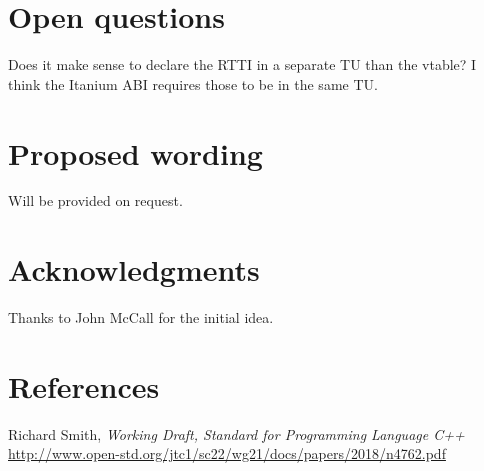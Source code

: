 \documentclass{wg21}
\begin{document}
\section{Open questions}
Does it make sense to declare the RTTI in a separate TU than the vtable?
I think the Itanium ABI requires those to be in the same TU.

\section{Proposed wording}
Will be provided on request.

\section{Acknowledgments}
Thanks to John McCall for the initial idea.

\section{References}
\renewcommand{\section}[2]{}%
\begin{thebibliography}{9}

  Richard Smith,
  \emph{Working Draft, Standard for Programming Language C++}\newline
  \url{http://www.open-std.org/jtc1/sc22/wg21/docs/papers/2018/n4762.pdf}

\end{thebibliography}
\end{document}
